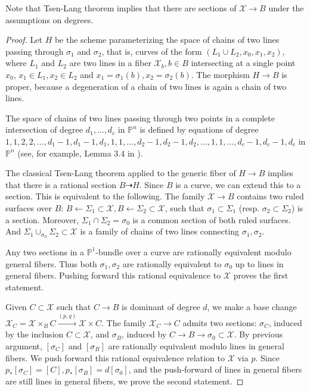 \documentclass{amsart}
\theoremstyle{definition}
\theoremstyle{remark}
\newcommand{\mbb}{\mathbb}
\newcommand{\PP}{\mbb{P}}
\newcommand{\mc}{\mathcal}
\newcommand{\mcX}{\mc{X}}
\begin{document}
Note that Tsen-Lang theorem implies that there are sections of $\mcX \to B$ under the assumptions on degrees.
\begin{proof}
Let $H$ be the scheme parameterizing the space of chains of two lines passing through $\sigma_1$ and $\sigma_2$, that is, curves of the form $(L_1\cup L_2, x_0, x_1, x_2)$, where $L_1$ and $L_2$ are two lines in a fiber $\mcX_b, b \in B$ intersecting at a single point $x_0$, $x_1 \in L_1, x_2 \in L_2$ and $x_1=\sigma_1(b), x_2=\sigma_2(b)$. 
The morphism $H \to B$ is proper, because a degeneration of a chain of two lines is again a chain of two lines. 


    The space of chains of two lines passing through two points in a complete intersection of degree $d_1, \ldots, d_c$ in $\PP^n$ is defined by equations of degree $1,1,2,2, \ldots, d_1-1, d_1-1, d_1, 1, 1, \ldots, d_2-1, d_2-1, d_2, \ldots, 1, 1, \ldots, d_c-1, d_c-1, d_c$ in $\PP^n$ (see, for example, Lemma 3.4 in \cite{Pan_conic}).
    
The classical Tsen-Lang theorem applied to the generic fiber of $H \to B$ implies that there is a rational section $B \dashrightarrow H$. Since $B$ is a curve, we can extend this to a section.
This is equivalent to the following.
The family $\mcX \to B$ contains two ruled surfaces over $B$: $B \leftarrow \Sigma_1 \subset \mathcal{X}, B \leftarrow \Sigma_2 \subset \mathcal{X}$, such that $\sigma_1 \subset \Sigma_1$ (resp. $\sigma_2 \subset \Sigma_2$) is a section.
Moreover, $\Sigma_1\cap \Sigma_2=\sigma_0$ is a common section of both ruled surfaces. And $\Sigma_1\cup_{\sigma_0} \Sigma_2 \subset \mcX$ is a family of chains of two lines connecting $\sigma_1, \sigma_2$.

Any  two sections in a $\PP^1$-bundle over a curve are rationally equivalent modulo general fibers.
Thus both $\sigma_1, \sigma_2$  are rationally equivalent to $\sigma_0$ up to lines in general fibers.
Pushing forward this rational equivalence to $\mcX$ proves the first statement.

Given $C\subset \mcX$ such that $C \to B$ is dominant of degree $d$, we make a base change $\mcX_C=\mcX \times_B C \xrightarrow{(p, q)} \mcX \times C$. 
The family $\mcX_C \to C$ admits two sections: $\sigma_C$, induced by the inclusion $C \subset \mcX$, and $\sigma_B$, induced by $C \to B \to \sigma_0 \subset \mcX$.
By previous argument, $[\sigma_C]$ and $[\sigma_B]$ are rationally equivalent modulo lines in general fibers.
We push forward this rational equivalence relation to $\mcX$ via $p$. Since $p_*[\sigma_C]=[C], p_*[\sigma_B]=d[\sigma_0]$, and the push-forward of lines in general fibers are still lines in general fibers, we prove the second statement.


\end{proof}
\end{document}
